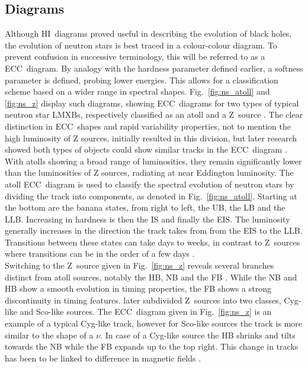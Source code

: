 \subsection{ Diagrams}
Although \ac{HI}~diagrams proved useful in describing the evolution of black holes, the evolution of neutron stars is best traced in a colour-colour diagram. To prevent confusion in successive terminology, this will be referred to as a \ac{ECC}~diagram. By analogy with the hardness parameter defined earlier, a softness parameter is defined, probing lower energies. This allows for a classification scheme based on a wider range in spectral shapes. Fig.~\ref{fig:ns_atoll} and \ref{fig:ns_z} display such diagrams, showing \ac{ECC}~diagrams for two types of typical neutron star \acp{LMXB}, respectively classified as an atoll and a Z~source . The clear distinction in \ac{ECC}~shapes and rapid variability properties, not to mention the high luminosity of Z sources, initially resulted in this division, but later research showed both types of objects could show similar tracks in the \ac{ECC}~diagram \citep{muno2002z,gierlinski2002comment}. With atolls showing a broad range of luminosities, they remain significantly lower than the luminosities of Z sources, radiating at near Eddington luminosity. The atoll \ac{ECC}~diagram is used to classify the spectral evolution of neutron stars by dividing the track into components, as denoted in Fig.~\ref{fig:ns_atoll}. Starting at the bottom are the banana states, from right to left, the \acf{UB}, the \acf{LB} and the \acf{LLB}. Increasing in hardness is then the \acf{IS} and finally the \acf{EIS}. The luminosity generally increases in the direction the track takes from from the \ac{EIS} to the \ac{LLB}. Transitions between these states can take days to weeks, in contrast to Z~sources where transitions can be in the order of a few days \citep{lin2009spectral}. \\

Switching to the Z~source given in Fig.~\ref{fig:ns_z} reveals several branches distinct from atoll sources, notably the \acf{HB}, \acf{NB} and the \acf{FB} \citep{hasinger1989two}. While the \ac{NB} and \ac{HB} show a smooth evolution in timing properties, the \ac{FB} shows a strong discontinuity in timing features. \citet{kuulkers1994spectral} later subdivided Z~sources into two classes, Cyg-like and Sco-like sources. The \ac{ECC}~diagram given in Fig.~\ref{fig:ns_z} is an example of a typical Cyg-like track, however for Sco-like sources the track is more similar to the shape of a $\nu$. In case of a Cyg-like source the \ac{HB} shrinks and tilts towards the \ac{NB} while the \ac{FB} expands up to the top right. This change in tracks has been to be linked to difference in magnetic fields \citep{psaltis1995x}.\\

